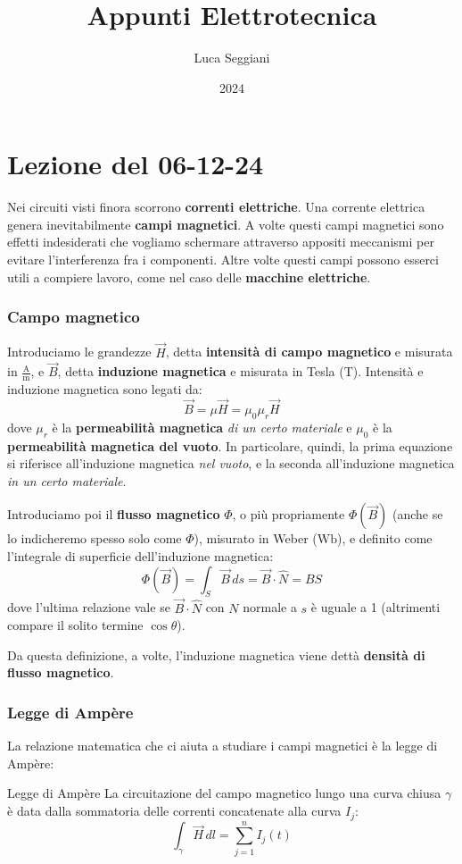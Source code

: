 \documentclass[a4paper,11pt]{article}
\title{Appunti Elettrotecnica}
\author{Luca Seggiani}
\date{2024}
\begin{document}
\section{Lezione del 06-12-24}

\thispagestyle{empty}
\pagestyle{fancy}

Nei circuiti visti finora scorrono \textbf{correnti elettriche}.
Una corrente elettrica genera inevitabilmente \textbf{campi magnetici}.
A volte questi campi magnetici sono effetti indesiderati che vogliamo schermare attraverso appositi meccanismi per evitare l'interferenza fra i componenti.
Altre volte questi campi possono esserci utili a compiere lavoro, come nel caso delle \textbf{macchine elettriche}.

\subsubsection{Campo magnetico}
Introduciamo le grandezze $\vec{H}$, detta \textbf{intensità di campo magnetico} e misurata in $\frac{\mathrm{A}}{\mathrm{m}}$, e $\vec{B}$, detta \textbf{induzione magnetica} e misurata in Tesla ($\mathrm{T}$).
Intensità e induzione magnetica sono legati da:
$$
\vec{B} = \mu \vec{H} = \mu_0 \mu_r \vec{H}
$$
dove $\mu_r$ è la \textbf{permeabilità magnetica} \textit{di un certo materiale} e $\mu_0$ è la \textbf{permeabilità magnetica del vuoto}.
In particolare, quindi, la prima equazione si riferisce all'induzione magnetica \textit{nel vuoto}, e la seconda all'induzione magnetica \textit{in un certo materiale}.

Introduciamo poi il \textbf{flusso magnetico} $\Phi$, o più propriamente $\Phi(\vec{B})$ (anche se lo indicheremo spesso solo come $\Phi$), misurato in Weber ($\mathrm{Wb}$), e definito come l'integrale di superficie dell'induzione magnetica:
$$
\Phi(\vec{B}) = \int_S \vec{B} \, ds = \vec{B} \cdot \hat{N} = BS
$$
dove l'ultima relazione vale se $\vec{B} \cdot \hat{N}$ con $N$ normale a $s$ è uguale a 1 (altrimenti compare il solito termine $\cos{\theta}$).

Da questa definizione, a volte, l'induzione magnetica viene dettà \textbf{densità di flusso magnetico}.

\subsubsection{Legge di Ampère}
La relazione matematica che ci aiuta a studiare i campi magnetici è la legge di Ampère:
\begin{theorem}{Legge di Ampère}
	La circuitazione  del campo magnetico lungo una curva chiusa $\gamma$ è data dalla sommatoria delle correnti concatenate alla curva $I_j$:
	$$
	\int_\gamma \vec{H} \, dl = \sum_{j=1}^n I_j(t)
	$$
\end{theorem}
\end{document}
